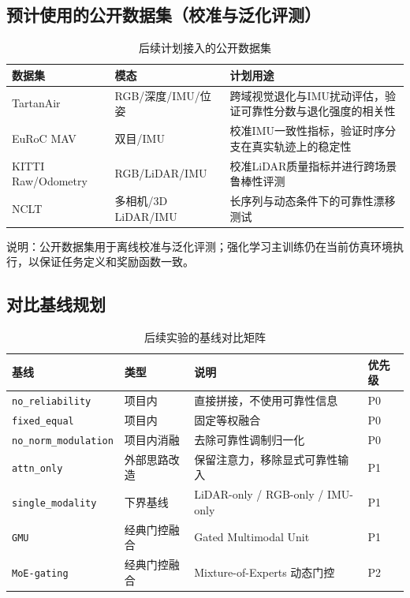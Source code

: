 \subsection{预计使用的公开数据集（校准与泛化评测）}
\begin{table}[h!]
    \centering
    \caption{后续计划接入的公开数据集}
    \label{tab-progress-plan-datasets}
    \footnotesize
    \begin{tabular}{p{2.3cm}p{2.0cm}p{5.5cm}}
        \toprule
        数据集 & 模态 & 计划用途 \\
        \midrule
        TartanAir & RGB/深度/IMU/位姿 & 跨域视觉退化与IMU扰动评估，验证可靠性分数与退化强度的相关性 \\
        EuRoC MAV & 双目/IMU & 校准IMU一致性指标，验证时序分支在真实轨迹上的稳定性 \\
        KITTI Raw/Odometry & RGB/LiDAR/IMU & 校准LiDAR质量指标并进行跨场景鲁棒性评测 \\
        NCLT & 多相机/3D LiDAR/IMU & 长序列与动态条件下的可靠性漂移测试 \\
        \bottomrule
    \end{tabular}
\end{table}

说明：公开数据集用于离线校准与泛化评测；强化学习主训练仍在当前仿真环境执行，以保证任务定义和奖励函数一致。

\subsection{对比基线规划}
\begin{table}[h!]
    \centering
    \caption{后续实验的基线对比矩阵}
    \label{tab-progress-plan-baselines}
    \footnotesize
    \begin{tabular}{p{3.0cm}p{1.8cm}p{4.6cm}p{1.2cm}}
        \toprule
        基线 & 类型 & 说明 & 优先级 \\
        \midrule
        \texttt{no\_reliability} & 项目内 & 直接拼接，不使用可靠性信息 & P0 \\
        \texttt{fixed\_equal} & 项目内 & 固定等权融合 & P0 \\
        \texttt{no\_norm\_modulation} & 项目内消融 & 去除可靠性调制归一化 & P0 \\
        \texttt{attn\_only} & 外部思路改造 & 保留注意力，移除显式可靠性输入 & P1 \\
        \texttt{single\_modality} & 下界基线 & LiDAR-only / RGB-only / IMU-only & P1 \\
        \texttt{GMU} & 经典门控融合 & Gated Multimodal Unit & P1 \\
        \texttt{MoE-gating} & 经典门控融合 & Mixture-of-Experts 动态门控 & P2 \\
        \bottomrule
    \end{tabular}
\end{table}

